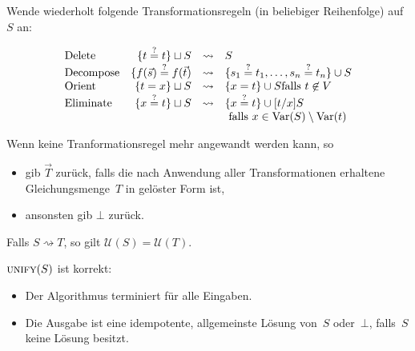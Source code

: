 \documentclass{cheat-sheet}
\DeclareMathOperator{\Var}{Var} %
\newcommand{\Unifiers}{\mathcal{U}} %
\begin{document}
\begin{alg}
  Wende wiederholt folgende Transformationsregeln (in beliebiger Reihenfolge) auf~$S$ an:
  \begin{framed}
    \[
      \begin{array}{l r c l}
        \text{Delete}
          & \{ t \overset{?}= t \} \sqcup S
          & \rightsquigarrow
          & S \\
        \text{Decompose}
          & \{ f(\vec{s}) \overset{?}= f(\vec{t})
          & \rightsquigarrow
          & \{ s_1 \overset{?}= t_1, \ldots, s_n \overset{?}= t_n \} \cup S \\
        \text{Orient}
          & \{ t = x \} \sqcup S
          & \rightsquigarrow
          & \{ x = t \} \cup S \text{falls $t \not\in V$} \\
        \text{Eliminate}
          & \{ x \overset{?}= t \} \sqcup S
          & \rightsquigarrow
          & \{ x \overset{?}= t \} \cup [t/x]S \\
          &&& \text{ falls $x \in \Var(S) \setminus \Var(t)$}
      \end{array}
    \]
  \end{framed}
  Wenn keine Tranformationsregel mehr angewandt werden kann, so
  \begin{itemize}
    \item gib $\vec{T}$ zurück, falls die nach Anwendung aller Transformationen erhaltene Gleichungsmenge~$T$ in gelöster Form ist,
    \item ansonsten gib $\bot$ zurück.
  \end{itemize}
\end{alg}

\begin{lem}
  Falls $S \rightsquigarrow T$, so gilt $\Unifiers(S) = \Unifiers(T)$.
\end{lem}

\begin{thm}
  $\Call{unify}{S}$ ist korrekt:
  \begin{itemize}
    \item Der Algorithmus terminiert für alle Eingaben.
    \item Die Ausgabe ist eine idempotente, allgemeinste Lösung von~$S$ oder~$\bot$, falls~$S$ keine Lösung besitzt.
  \end{itemize}
\end{thm}
\end{document}
